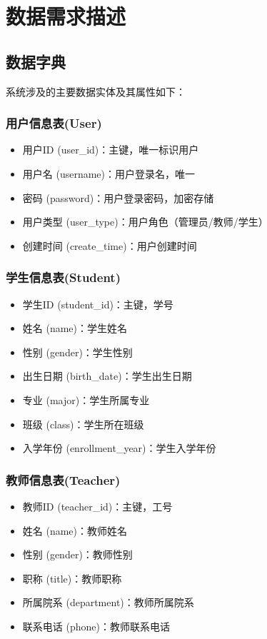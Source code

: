 \documentclass{zjut-report}
\begin{document}
\section{数据需求描述}

\subsection{数据字典}

系统涉及的主要数据实体及其属性如下：

\subsubsection{用户信息表(User)}
\begin{itemize}
\item 用户ID (user\_id)：主键，唯一标识用户
\item 用户名 (username)：用户登录名，唯一
\item 密码 (password)：用户登录密码，加密存储
\item 用户类型 (user\_type)：用户角色（管理员/教师/学生）
\item 创建时间 (create\_time)：用户创建时间
\end{itemize}

\subsubsection{学生信息表(Student)}
\begin{itemize}
\item 学生ID (student\_id)：主键，学号
\item 姓名 (name)：学生姓名
\item 性别 (gender)：学生性别
\item 出生日期 (birth\_date)：学生出生日期
\item 专业 (major)：学生所属专业
\item 班级 (class)：学生所在班级
\item 入学年份 (enrollment\_year)：学生入学年份
\end{itemize}

\subsubsection{教师信息表(Teacher)}
\begin{itemize}
\item 教师ID (teacher\_id)：主键，工号
\item 姓名 (name)：教师姓名
\item 性别 (gender)：教师性别
\item 职称 (title)：教师职称
\item 所属院系 (department)：教师所属院系
\item 联系电话 (phone)：教师联系电话
\end{itemize}
\end{document}
